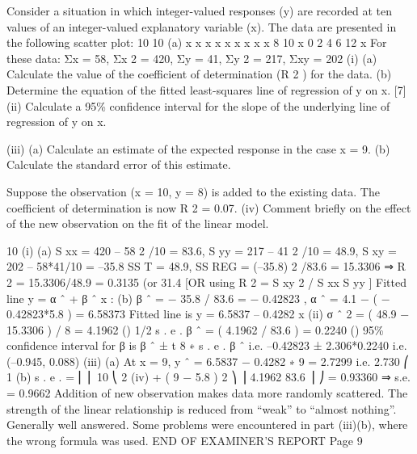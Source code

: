 \documentclass[a4paper,12pt]{article}
\begin{document}
\begin{enumerate}Consider a situation in which integer-valued responses (y) are recorded at ten values
of an integer-valued explanatory variable (x). The data are presented in the following
scatter plot:
10
10
(a)
x
x
x
x
x
x
x
x x
8 10
x
0
2
4
6
12
x
For these data: Σx = 58, Σx 2 = 420, Σy = 41, Σy 2 = 217, Σxy = 202
(i)
(a) Calculate the value of the coefficient of determination (R 2 ) for the data.
(b) Determine the equation of the fitted least-squares line of regression of
y on x.
[7]
(ii) Calculate a 95\% confidence interval for the slope of the underlying line of
regression of y on x.

(iii) (a)
Calculate an estimate of the expected response in the case x = 9.
(b)
Calculate the standard error of this estimate.

Suppose the observation (x = 10, y = 8) is added to the existing data. The coefficient
of determination is now R 2 = 0.07.
(iv)
Comment briefly on the effect of the new observation on the fit of the linear
model.
\end{enumerate}

10
(i)
(a)
S xx = 420 – 58 2 /10 = 83.6, S yy = 217 – 41 2 /10 = 48.9,
S xy = 202 – 58*41/10 = –35.8
SS T = 48.9, SS REG = (–35.8) 2 /83.6 = 15.3306
⇒ R 2 = 15.3306/48.9 = 0.3135 (or 31.4%
[OR using R 2 = S xy 2 / S xx S yy ]
Fitted line y = α ˆ + β ˆ x :
(b)
β ˆ = − 35.8 / 83.6 = − 0.42823 , α ˆ = 4.1 − ( − 0.42823*5.8 ) = 6.58373
Fitted line is y = 6.5837 – 0.4282 x
(ii)
σ ˆ 2 = ( 48.9 − 15.3306 ) / 8 = 4.1962
()
1/2
s . e . β ˆ = ( 4.1962 / 83.6 ) = 0.2240
()
95\% confidence interval for β is β ˆ ± t 8 ∗ s . e . β ˆ
i.e. –0.42823 ± 2.306*0.2240
i.e. (–0.945, 0.088)
(iii)
(a) At x = 9, y ˆ = 6.5837 − 0.4282 ∗ 9 = 2.7299 i.e. 2.730
⎛ 1
(b) s . e . = ⎜
⎜ 10
⎝
2
(iv)
+
( 9 − 5.8 ) 2 ⎞ ⎟ 4.1962
83.6
⎟
⎠
= 0.93360 ⇒ s.e. = 0.9662
Addition of new observation makes data more randomly scattered. The
strength of the linear relationship is reduced from “weak” to “almost nothing”.
Generally well answered. Some problems were encountered in part (iii)(b), where the wrong
formula was used.
END OF EXAMINER’S REPORT
Page 9
\end{document}
